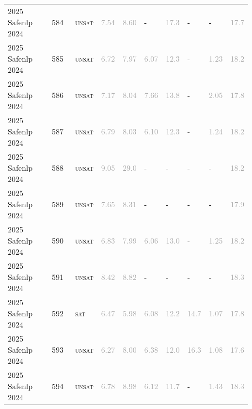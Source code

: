 \begin{center}
{\begin{longtable}{@{}llllllllll@{}}
2025 Safenlp 2024 & 584 & ~\textsc{unsat} & \textcolor{darkgray}{7.54} & \textcolor{darkgray}{8.60} & - & \textcolor{darkgray}{17.3} & - & - & \textcolor{darkgray}{17.7} \\
2025 Safenlp 2024 & 585 & ~\textsc{unsat} & \textcolor{darkgray}{6.72} & \textcolor{darkgray}{7.97} & \textcolor{darkgray}{6.07} & \textcolor{darkgray}{12.3} & - & \textcolor{darkgray}{1.23} & \textcolor{darkgray}{18.2} \\
2025 Safenlp 2024 & 586 & ~\textsc{unsat} & \textcolor{darkgray}{7.17} & \textcolor{darkgray}{8.04} & \textcolor{darkgray}{7.66} & \textcolor{darkgray}{13.8} & - & \textcolor{darkgray}{2.05} & \textcolor{darkgray}{17.8} \\
2025 Safenlp 2024 & 587 & ~\textsc{unsat} & \textcolor{darkgray}{6.79} & \textcolor{darkgray}{8.03} & \textcolor{darkgray}{6.10} & \textcolor{darkgray}{12.3} & - & \textcolor{darkgray}{1.24} & \textcolor{darkgray}{18.2} \\
2025 Safenlp 2024 & 588 & ~\textsc{unsat} & \textcolor{darkgray}{9.05} & \textcolor{darkgray}{29.0} & - & - & - & - & \textcolor{darkgray}{18.2} \\
2025 Safenlp 2024 & 589 & ~\textsc{unsat} & \textcolor{darkgray}{7.65} & \textcolor{darkgray}{8.31} & - & - & - & - & \textcolor{darkgray}{17.9} \\
2025 Safenlp 2024 & 590 & ~\textsc{unsat} & \textcolor{darkgray}{6.83} & \textcolor{darkgray}{7.99} & \textcolor{darkgray}{6.06} & \textcolor{darkgray}{13.0} & - & \textcolor{darkgray}{1.25} & \textcolor{darkgray}{18.2} \\
2025 Safenlp 2024 & 591 & ~\textsc{unsat} & \textcolor{darkgray}{8.42} & \textcolor{darkgray}{8.82} & - & - & - & - & \textcolor{darkgray}{18.3} \\
2025 Safenlp 2024 & 592 & ~\textsc{sat} & \textcolor{darkgray}{6.47} & \textcolor{darkgray}{5.98} & \textcolor{darkgray}{6.08} & \textcolor{darkgray}{12.2} & \textcolor{darkgray}{14.7} & \textcolor{darkgray}{1.07} & \textcolor{darkgray}{17.8} \\
2025 Safenlp 2024 & 593 & ~\textsc{unsat} & \textcolor{darkgray}{6.27} & \textcolor{darkgray}{8.00} & \textcolor{darkgray}{6.38} & \textcolor{darkgray}{12.0} & \textcolor{darkgray}{16.3} & \textcolor{darkgray}{1.08} & \textcolor{darkgray}{17.6} \\
2025 Safenlp 2024 & 594 & ~\textsc{unsat} & \textcolor{darkgray}{6.78} & \textcolor{darkgray}{8.98} & \textcolor{darkgray}{6.12} & \textcolor{darkgray}{11.7} & - & \textcolor{darkgray}{1.43} & \textcolor{darkgray}{18.3} \\

\end{longtable}}
\end{center}
